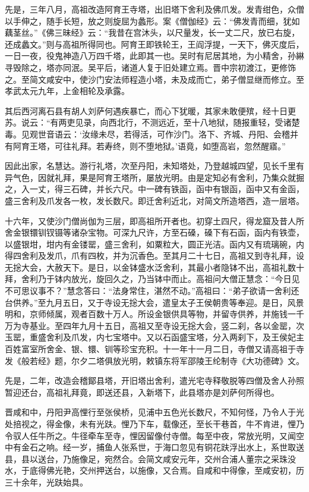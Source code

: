 \documentclass[12pt,UTF8]{ctexbook}
\begin{document}
先是，三年八月，高祖改造阿育王寺塔，出旧塔下舍利及佛爪发。发青绀色，众僧以手伸之，随手长短，放之则旋屈为蠡形。案《僧伽经》云：“佛发青而细，犹如藕茎丝。”《佛三昧经》云：“我昔在宫沐头，以尺量发，长一丈二尺，放已右旋，还成蠡文。”则与高祖所得同也。阿育王即铁轮王，王阎浮提，一天下，佛灭度后，一日一夜，役鬼神造八万四千塔，此即其一也。吴时有尼居其地，为小精舍，孙綝寻毁除之，塔亦同泯。吴平后，诸道人复于旧处建立焉。晋中宗初渡江，更修饰之。至简文咸安中，使沙门安法师程造小塔，未及成而亡，弟子僧显继而修立。至孝武太元九年，上金相轮及承露。

其后西河离石县有胡人刘萨何遇疾暴亡，而心下犹暖，其家未敢便殡，经十日更苏。说云：“有两吏见录，向西北行，不测远近，至十八地狱，随报重轻，受诸楚毒。见观世音语云：‘汝缘未尽，若得活，可作沙门。洛下、齐城、丹阳、会稽并有阿育王塔，可往礼拜。若寿终，则不堕地狱。’语竟，如堕高岩，忽然醒寤。”

因此出家，名慧达。游行礼塔，次至丹阳，未知塔处，乃登越城四望，见长千里有异气色，因就礼拜，果是阿育王塔所，屡放光明。由是定知必有舍利，乃集众就掘之，入一丈，得三石碑，并长六尺。中一碑有铁函，函中有银函，函中又有金函，盛三舍利及爪发各一枚，发长数尺。即迁舍利近北，对简文所造塔西，造一层塔。

十六年，又使沙门僧尚伽为三层，即高祖所开者也。初穿土四尺，得龙窟及昔人所舍金银镮钏钗镊等诸杂宝物。可深九尺许，方至石磉，磉下有石函，函内有铁壶，以盛银坩，坩内有金镂罂，盛三舍利，如粟粒大，圆正光洁。函内又有琉璃碗，内得四舍利及发爪，爪有四枚，并为沉香色。至其月二十七日，高祖又到寺礼拜，设无捴大会，大赦天下。是日，以金钵盛水泛舍利，其最小者隐钵不出，高祖礼数十拜，舍利乃于钵内放光，旋回久之，乃当钵中而止。高祖问大僧正慧念：“今日见不可思议事不？”慧念答曰：“法身常住，湛然不动。”高祖曰：“弟子欲请一舍利还台供养。”至九月五日，又于寺设无捴大会，遣皇太子王侯朝贵等奉迎。是日，风景明和，京师倾属，观者百数十万人。所设金银供具等物，并留寺供养，并施钱一千万为寺基业。至四年九月十五日，高祖又至寺设无捴大会，竖二刹，各以金罂，次玉罂，重盛舍利及爪发，内七宝塔中。又以石函盛宝塔，分入两刹下，及王侯妃主百姓富室所舍金、银、镮、钏等珍宝充积。十一年十一月二日，寺僧又请高祖于寺发《般若经》题，尔夕二塔俱放光明，敕镇东将军邵陵王纶制寺《大功德碑》文。

先是，二年，改造会稽鄮县塔，开旧塔出舍利，遣光宅寺释敬脱等四僧及舍人孙照暂迎还台，高祖礼拜竟，即送还县，入新塔下，此县塔亦是刘萨何所得也。

晋咸和中，丹阳尹高悝行至张侯桥，见浦中五色光长数尺，不知何怪，乃令人于光处掊视之，得金像，未有光趺。悝乃下车，载像还，至长干巷首，牛不肯进，悝乃令驭人任牛所之。牛径牵车至寺，悝因留像付寺僧。每至中夜，常放光明，又闻空中有金石之响。经一岁，捕鱼人张系世，于海口忽见有铜花趺浮出水上，系世取送县，县以送台，乃施像足，宛然合。会简文咸安元年，交州合浦人董宗之采珠没水，于底得佛光艳，交州押送台，以施像，又合焉。自咸和中得像，至咸安初，历三十余年，光趺始具。
\end{document}
